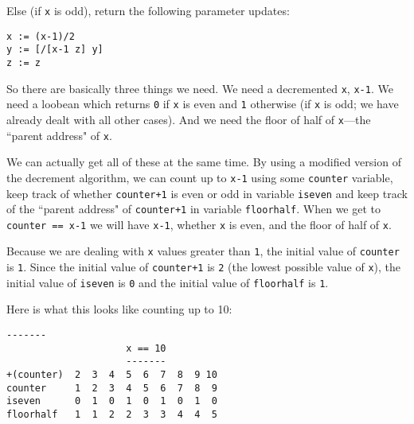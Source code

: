 \documentclass[twoside]{article}
\begin{document}
Else (if \lstinline[style=inlinecode]{x} is odd), return the following parameter updates:

\begin{lstlisting}[style=listingblock]
x := (x-1)/2
y := [/[x-1 z] y]
z := z
\end{lstlisting}

So there are basically three things we need. We need a decremented \lstinline[style=inlinecode]{x}, \lstinline[style=inlinecode]{x-1}. We need a loobean which returns \lstinline[style=inlinecode]{0} if \lstinline[style=inlinecode]{x} is even and \lstinline[style=inlinecode]{1} otherwise (if \lstinline[style=inlinecode]{x} is odd; we have already dealt with all other cases). And we need the floor of half of \lstinline[style=inlinecode]{x}---the ``parent address" of \lstinline[style=inlinecode]{x}.

We can actually get all of these at the same time. By using a modified version of the decrement algorithm, we can count up to \lstinline[style=inlinecode]{x-1} using some \lstinline[style=inlinecode]{counter} variable, keep track of whether \lstinline[style=inlinecode]{counter+1} is even or odd in variable \lstinline[style=inlinecode]{iseven} and keep track of the ``parent address" of \lstinline[style=inlinecode]{counter+1} in variable \lstinline[style=inlinecode]{floorhalf}. When we get to \lstinline[style=inlinecode]{counter == x-1} we will have \lstinline[style=inlinecode]{x-1}, whether \lstinline[style=inlinecode]{x} is even, and the floor of half of \lstinline[style=inlinecode]{x}.

Because we are dealing with \lstinline[style=inlinecode]{x} values greater than \lstinline[style=inlinecode]{1}, the initial value of \lstinline[style=inlinecode]{counter} is \lstinline[style=inlinecode]{1}. Since the initial value of \lstinline[style=inlinecode]{counter+1} is \lstinline[style=inlinecode]{2} (the lowest possible value of \lstinline[style=inlinecode]{x}), the initial value of \lstinline[style=inlinecode]{iseven} is \lstinline[style=inlinecode]{0} and the initial value of \lstinline[style=inlinecode]{floorhalf} is \lstinline[style=inlinecode]{1}.

Here is what this looks like counting up to 10:

\begin{lstlisting}[style=listingblock]
                     -------
                     x == 10
                     -------
+(counter)  2  3  4  5  6  7  8  9 10
counter     1  2  3  4  5  6  7  8  9
iseven      0  1  0  1  0  1  0  1  0
floorhalf   1  1  2  2  3  3  4  4  5
\end{lstlisting}
\end{document}
